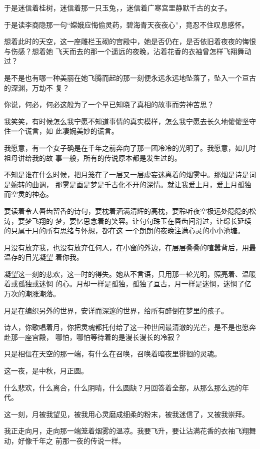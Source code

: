 \documentclass[12pt,a4paper]{article}
\begin{document}
		于是迷信着桂树，迷信着那一只玉兔，，迷信着广寒宫里静默千古的女子。

		于是读李商隐那一句“嫦娥应悔偷灵药，碧海青天夜夜心”，竟忍不住叹息感怀。

		想着此时的天空，这一座雕栏玉砌的宫殿中，她是否仍在，是否依旧着夜夜的悔恨与伤感？想着她
	飞天而去的那一个遥远的夜晚，沾着花香的衣袖曾怎样飞翔舞动过？

		是不是也有哪一种美丽在她飞腾而起的那一刻便永远永远地坠落了，坠入一个亘古的深渊，万劫不
	复？

		你说，何必，何必这般为了一个早已知晓了真相的故事而劳神苦思？

		我笑笑，有时候怎么我宁愿不知道事情的真实模样，怎么我宁愿去长久地傻傻坚守住一个谎言，如
	此凄婉美妙的谎言。

		我愿意，有一个女子确是在千年之前奔向了那一团冷冷的光明了。我愿意，如儿时祖母讲给我的故
	事一般，所有的传说原本都是发生过的。

		不知是谁在什么时候，把月笼在了一层又一层虚妄迷离着的烟雾中。那烟是诗是词是婉转的曲调，
	那雾是画是梦是千古化不开的深情。就让我爱上月，爱上月孤独而空灵的神态。

		要读着令人唇齿留香的诗句，要枕着洒满清辉的高枕，要聆听夜空极远处隐隐的松涛，要梦飞翔的
	梦，要忆思念着的笑容。让句句珠玉在唇齿间滑过，让绵长延续的只属于月的所有思绪与怀想，都在这
	一个朗朗的夜晚注满心灵的小小池塘。

		月没有放弃我，也没有放弃任何人，在小窗的外边，在层层叠叠的喧嚣背后，用最温存的目光凝望
	着你我。

		凝望这一刻的悲欢，这一时的得失。她从不言语，只用那一轮光明，照亮着、温暖着或孤独或迷惘
	的心。月却一样是孤独，孤独了亘古，月一样是迷惘，迷惘了亿万次的潮涨潮落。

		月是在编织另外的世界，安详而深邃的世界，给所有醉倒在梦里的孩子。

		诗人，你歌唱着月，你把灵魂都托付给了这一种世间最清澈的光芒，是不是也愿奔赴那一座宫殿，
	哪怕，哪怕等待着的是漫长漫长的冷寂？

		只是相信在天空的那一端，有什么在召唤，召唤着暗夜里徘徊的灵魂。

		这一夜，是中秋，月正圆。

		什么悲欢，什么离合，什么阴晴，什么圆缺？月回答着全部，从那么那么远的年代。

		这一刻，月被我望见，被我用心灵磨成细柔的粉末，被我迷信了，又被我崇拜。

		我正走向月，走向那一端笼着烟雾的温凉。我要飞升，要让沾满花香的衣袖飞翔舞动，好像千年之
	前那一夜的传说一样。
\end{document}
